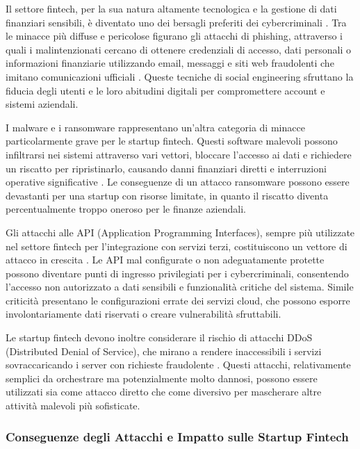 \documentclass[a4paper,12pt]{report}
\begin{document}
Il settore fintech, per la sua natura altamente tecnologica e la gestione di dati finanziari sensibili, è diventato uno dei bersagli preferiti dei cybercriminali \cite{cyberThreatsFintech}. Tra le minacce più diffuse e pericolose figurano gli attacchi di phishing, attraverso i quali i malintenzionati cercano di ottenere credenziali di accesso, dati personali o informazioni finanziarie utilizzando email, messaggi e siti web fraudolenti che imitano comunicazioni ufficiali \cite{cyberThreatsFintech}. Queste tecniche di social engineering sfruttano la fiducia degli utenti e le loro abitudini digitali per compromettere account e sistemi aziendali.

I malware e i ransomware rappresentano un’altra categoria di minacce particolarmente grave per le startup fintech. Questi software malevoli possono infiltrarsi nei sistemi attraverso vari vettori, bloccare l’accesso ai dati e richiedere un riscatto per ripristinarlo, causando danni finanziari diretti e interruzioni operative significative \cite{cyberThreatsFintech}. Le conseguenze di un attacco ransomware possono essere devastanti per una startup con risorse limitate, in quanto il riscatto diventa percentualmente troppo oneroso per le finanze aziendali.

Gli attacchi alle API (Application Programming Interfaces), sempre più utilizzate nel settore fintech per l’integrazione con servizi terzi, costituiscono un vettore di attacco in crescita \cite{fintechChallenges}. Le API mal configurate o non adeguatamente protette possono diventare punti di ingresso privilegiati per i cybercriminali, consentendo l’accesso non autorizzato a dati sensibili e funzionalità critiche del sistema. Simile criticità presentano le configurazioni errate dei servizi cloud, che possono esporre involontariamente dati riservati o creare vulnerabilità sfruttabili.

Le startup fintech devono inoltre considerare il rischio di attacchi DDoS (Distributed Denial of Service), che mirano a rendere inaccessibili i servizi sovraccaricando i server con richieste fraudolente \cite{fintechChallenges}. Questi attacchi, relativamente semplici da orchestrare ma potenzialmente molto dannosi, possono essere utilizzati sia come attacco diretto che come diversivo per mascherare altre attività malevoli più sofisticate.

\subsubsection*{Conseguenze degli Attacchi e Impatto sulle Startup Fintech}
\end{document}
